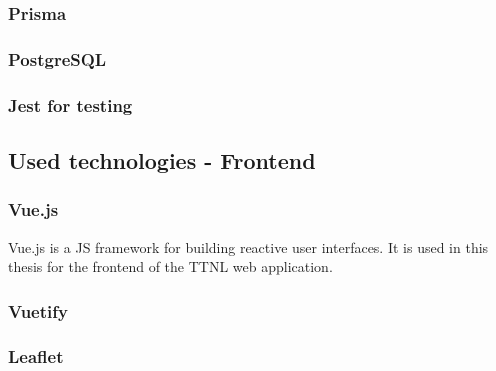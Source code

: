 \subsubsection{Prisma}

\subsubsection{PostgreSQL}

\subsubsection{Jest for testing}

\subsection{Used technologies - Frontend}

\subsubsection{Vue.js}

Vue.js is a \ac{JS} framework for building reactive user interfaces.
It is used in this thesis for the frontend of the \ac{TTNL} web application.

\subsubsection{Vuetify}

\subsubsection{Leaflet}